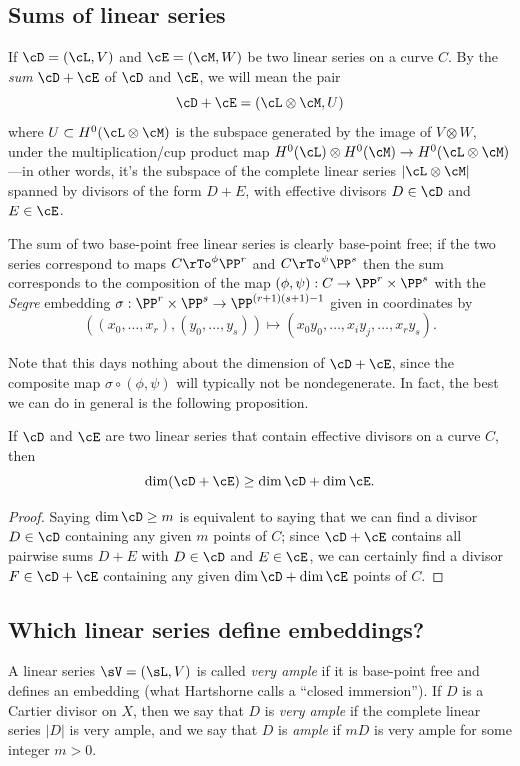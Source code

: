\subsection{Sums of linear series}
If
$\cD = (\cL,V)$ and $\cE = (\cM, W)$ be two linear series on a curve $C$. By the \emph{sum} $\cD + \cE$ of $\cD$ and $\cE$, we will mean the pair 
$$
\cD + \cE = (\cL \otimes \cM, U) 
$$
where $U \subset H^0(\cL \otimes \cM)$ is the subspace generated by the image of $V \otimes W$, under the multiplication/cup product map $H^0(\cL) \otimes H^0(\cM) \to H^0(\cL \otimes \cM)$---in other words, it's the subspace of the complete linear series $|\cL\otimes \cM|$ spanned by divisors of the form $D+E$, with effective divisors $D \in \cD$ and $E \in \cE$.
 
The sum of two base-point free linear series is clearly base-point free; if the two series correspond to maps
$C\rTo^\phi \PP^r$ and $C\rTo^\psi \PP^s$ then the sum corresponds to the composition of the map
$(\phi, \psi): C\to \PP^r\times \PP^s$ with the \emph{Segre} embedding $\sigma : \PP^r\times \PP^s \to \PP^{(r+1)(s+1)-1}$
given in coordinates by
$$
((x_0,\dots, x_r), (y_0, \dots, y_s))\mapsto (x_0y_0, \dots, x_iy_j, \dots, x_ry_s).
$$

Note that this days nothing about the dimension of $\cD + \cE$, since the composite map $\sigma \circ (\phi, \psi)$ will typically not be nondegenerate. In fact, the best we can do in general is the following proposition.


\begin{proposition}\label{sum of linear series}
 If $\cD$ and $\cE$ are two  linear series that contain effective divisors on a curve $C$, then
$$
\dim(\cD + \cE) \geq \dim \cD + \dim \cE.
$$
\end{proposition}
\begin{proof}
Saying $\dim \cD \geq m$ is equivalent to saying that we can find a divisor $D \in \cD$ containing any given $m$ points of $C$; since $\cD + \cE$ contains all pairwise sums $D + E$ with $D \in \cD$ and $E \in \cE$, we can certainly find a divisor $F \in \cD + \cE$ containing any given $\dim \cD + \dim \cE$ points of $C$.
\end{proof}

\subsection{Which linear series define embeddings?}

A linear series $\sV = (\sL, V)$ is called  \emph{very ample}  if it is base-point free and defines an embedding (what Hartshorne calls a ``closed immersion''). If $D$ is a Cartier divisor on $X$, then we say that $D$ is \emph{very ample} if the complete linear series $|D|$ is very ample, and we say that $D$ is \emph{ample} if $mD$ is very ample for some integer $m>0$. 

